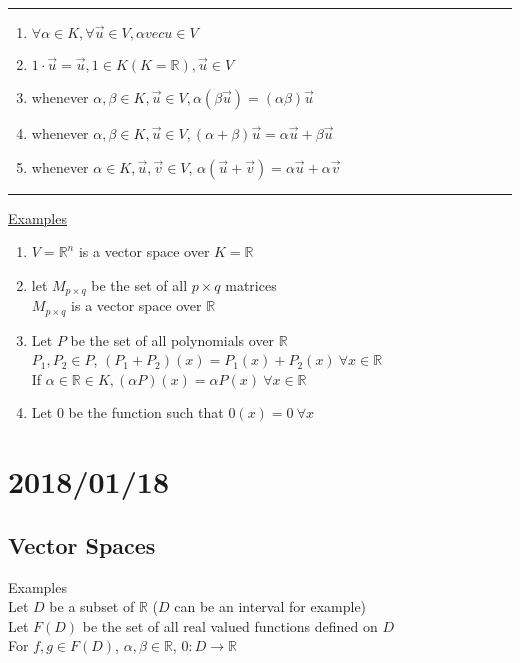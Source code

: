 \documentclass[12pt]{article}
\renewcommand{\v}[1]{\overrightarrow{#1}}
\newcommand{\real}[0]{\mathbb{R}}
\newenvironment{examples}{\underline{Examples}\begin{enumerate}}{\end{enumerate}}
\newcommand{\pp}[1]{\left(#1\right)}
\newcommand{\divider}[0]{\textcolor{lightgray}{\rule{\textwidth}{0.1pt}}}
\begin{document}
\divider

\begin{enumerate}[label=\(S_{\arabic*}\)]
	\item \(\forall \alpha \in K, \forall \v{u} \in V, \alpha vec{u} \in V\)
	\item \(1 \cdot \v{u} = \v{u}, 1 \in K(K = \real), \v{u} \in V\)
	\item whenever \(\alpha, \beta \in K, \v{u} \in V, \alpha \pp{\beta \v{u}} = \pp{\alpha \beta} \v{u}\)
	\item whenever \(\alpha, \beta \in K, \v{u} \in V, \pp{\alpha + \beta}\v{u} = \alpha \v{u} + \beta \v{u}\)
	\item whenever \(\alpha \in K, \v{u}, \v{v} \in V\), \(\alpha \pp{\v{u} + \v{v}} = \alpha \v{u} + \alpha \v{v}\)
\end{enumerate}

\divider

\begin{examples}
	\item \(V = \real^n\) is a vector space over \(K = \real\)
	\item let \(M_{p \times q}\) be the set of all \(p \times q\) matrices \\
	\(M_{p \times q}\) is a vector space over \(\real\)
	\item Let \(P\) be the set of all polynomials over \(\real\) \\
	\(P_1, P_2 \in P\), \(\pp{P_1 + P_2}(x) = P_1(x) + P_2(x) \ \forall x \in \real\) \\
	If \(\alpha \in \real \in K, \pp{\alpha P}(x) = \alpha P(x) \ \forall x \in \real\)
	\item Let \(0\) be the function such that \(0(x) = 0 \ \forall x\) 
\end{examples}

\section{2018/01/18}

\subsection{Vector Spaces}

Examples \\
Let $D$ be a subset of $\real$ ($D$ can be an interval for example) \\
Let $F(D)$ be the set of all real valued functions defined on $D$ \\
For $f, g \in F(D)$, $\alpha, \beta \in \real$, $0 : D \rightarrow \real$
\end{document}
